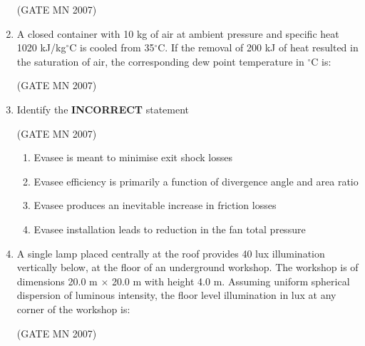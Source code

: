\documentclass[journal]{IEEEtran}
\begin{document}
\begin{enumerate}
\hfill (GATE MN 2007)
\begin{enumerate}
\end{enumerate}


\item A closed container with 10 kg of air at ambient pressure and specific heat 1020 kJ/kg$^\circ$C is cooled from 35$^\circ$C. If the removal of 200 kJ of heat resulted in the saturation of air, the corresponding dew point temperature in $^\circ$C is:


	\hfill (GATE MN 2007)
\begin{enumerate}
\end{enumerate}


\item Identify the \textbf{INCORRECT} statement

	\hfill (GATE MN 2007)
\begin{enumerate}
\item Evasee is meant to minimise exit shock losses
\item Evasee efficiency is primarily a function of divergence angle and area ratio
\item Evasee produces an inevitable increase in friction losses
\item Evasee installation leads to reduction in the fan total pressure
\end{enumerate}


\item A single lamp placed centrally at the roof provides 40 lux illumination vertically below, at the floor of an underground workshop. The workshop is of dimensions 20.0 m $\times$ 20.0 m with height 4.0 m. Assuming uniform spherical dispersion of luminous intensity, the floor level illumination in lux at any corner of the workshop is:


	\hfill (GATE MN 2007)
\begin{enumerate}
\end{enumerate}



\end{enumerate}
\end{document}
